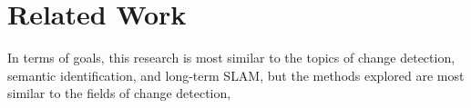 \section{Related Work}
\label{sec:related_work}

In terms of goals, this research is most similar to the topics of change detection, semantic identification, and long-term SLAM, but the methods explored are most similar to the fields of change detection, 

% 